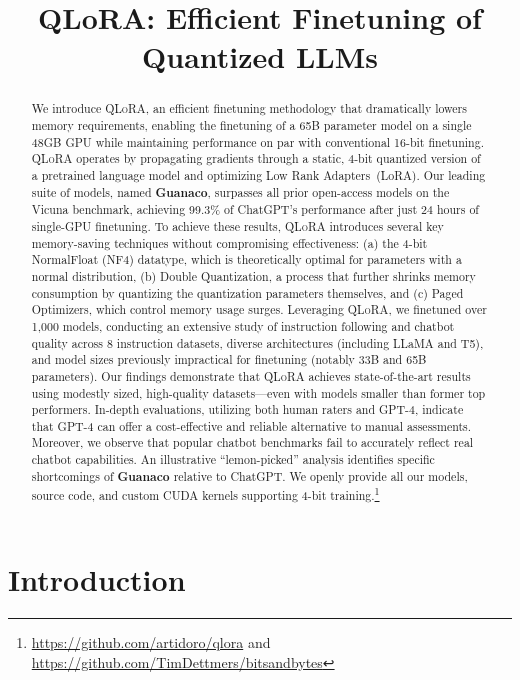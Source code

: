 \title{QLoRA: Efficient Finetuning of Quantized LLMs}

\begin{abstract}
We introduce \textsc{QLoRA}, an efficient finetuning methodology that dramatically lowers memory requirements, enabling the finetuning of a 65B parameter model on a single 48GB GPU while maintaining performance on par with conventional 16-bit finetuning. \textsc{QLoRA} operates by propagating gradients through a static, 4-bit quantized version of a pretrained language model and optimizing Low Rank Adapters~(LoRA). Our leading suite of models, named \textbf{Guanaco}, surpasses all prior open-access models on the Vicuna benchmark, achieving 99.3\% of ChatGPT's performance after just 24 hours of single-GPU finetuning. To achieve these results, \textsc{QLoRA} introduces several key memory-saving techniques without compromising effectiveness: (a) the 4-bit NormalFloat (NF4) datatype, which is theoretically optimal for parameters with a normal distribution, (b) Double Quantization, a process that further shrinks memory consumption by quantizing the quantization parameters themselves, and (c) Paged Optimizers, which control memory usage surges. Leveraging \textsc{QLoRA}, we finetuned over 1,000 models, conducting an extensive study of instruction following and chatbot quality across 8 instruction datasets, diverse architectures (including LLaMA and T5), and model sizes previously impractical for finetuning (notably 33B and 65B parameters). Our findings demonstrate that \textsc{QLoRA} achieves state-of-the-art results using modestly sized, high-quality datasets—even with models smaller than former top performers. In-depth evaluations, utilizing both human raters and GPT-4, indicate that GPT-4 can offer a cost-effective and reliable alternative to manual assessments. Moreover, we observe that popular chatbot benchmarks fail to accurately reflect real chatbot capabilities. An illustrative “lemon-picked” analysis identifies specific shortcomings of \textbf{Guanaco} relative to ChatGPT. We openly provide all our models, source code, and custom CUDA kernels supporting 4-bit training.\footnote{\url{https://github.com/artidoro/qlora} and \url{https://github.com/TimDettmers/bitsandbytes}}
\end{abstract}

\section{Introduction}

